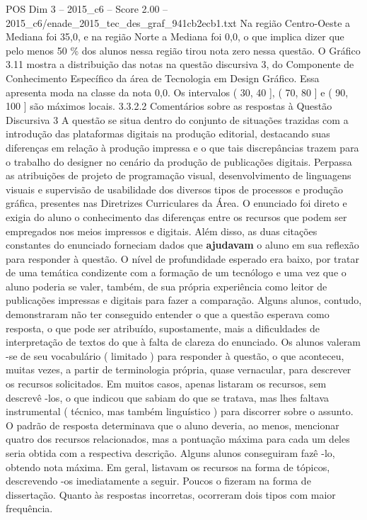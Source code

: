 \begin{textsample}{POS Dim 3 – 2015\_c6 – Score 2.00 – 2015\_c6/enade\_2015\_tec\_des\_graf\_941cb2ecb1.txt}
Na região Centro-Oeste a Mediana foi 35,0, e na região Norte a Mediana foi 0,0, o que implica dizer que pelo menos 50 \% dos alunos nessa região tirou nota zero nessa questão.
O Gráfico 3.11 mostra a distribuição das notas na questão discursiva 3, do Componente de Conhecimento Específico da área de Tecnologia em Design Gráfico.
Essa apresenta moda na classe da nota 0,0.
Os intervalos ( 30, 40 ], ( 70, 80 ] e ( 90, 100 ] são máximos locais. 3.3.2.2 Comentários sobre as respostas à Questão Discursiva 3 A questão se situa dentro do conjunto de situações trazidas com a introdução das plataformas digitais na produção editorial, destacando suas diferenças em relação à produção impressa e o que tais discrepâncias trazem para o trabalho do designer no cenário da produção de publicações digitais.
Perpassa as atribuições de projeto de programação visual, desenvolvimento de linguagens visuais e supervisão de usabilidade dos diversos tipos de processos e produção gráfica, presentes nas Diretrizes Curriculares da Área.
O enunciado foi direto e exigia do aluno o conhecimento das diferenças entre os recursos que podem ser empregados nos meios impressos e digitais.
Além disso, as duas citações constantes do enunciado forneciam dados que \textbf{ajudavam} o aluno em sua reflexão para responder à questão.
O nível de profundidade esperado era baixo, por tratar de uma temática condizente com a formação de um tecnólogo e uma vez que o aluno poderia se valer, também, de sua própria experiência como leitor de publicações impressas e digitais para fazer a comparação.
Alguns alunos, contudo, demonstraram não ter conseguido entender o que a questão esperava como resposta, o que pode ser atribuído, supostamente, mais a dificuldades de interpretação de textos do que à falta de clareza do enunciado.
Os alunos valeram -se de seu vocabulário ( limitado ) para responder à questão, o que aconteceu, muitas vezes, a partir de terminologia própria, quase vernacular, para descrever os recursos solicitados.
Em muitos casos, apenas listaram os recursos, sem descrevê -los, o que indicou que sabiam do que se tratava, mas lhes faltava instrumental ( técnico, mas também linguístico ) para discorrer sobre o assunto.
O padrão de resposta determinava que o aluno deveria, ao menos, mencionar quatro dos recursos relacionados, mas a pontuação máxima para cada um deles seria obtida com a respectiva descrição.
Alguns alunos conseguiram fazê -lo, obtendo nota máxima.
Em geral, listavam os recursos na forma de tópicos, descrevendo -os imediatamente a seguir.
Poucos o fizeram na forma de dissertação.
Quanto às respostas incorretas, ocorreram dois tipos com maior frequência.

\end{textsample}
